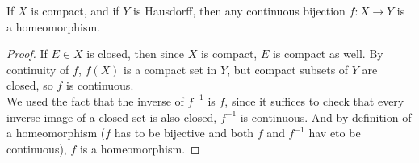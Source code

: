 \documentclass[../../main.tex]{subfiles}
\begin{document}
\begin{wts}
If $X$ is compact, and if $Y$ is Hausdorff, then any continuous bijection $f:X\to Y$ is a homeomorphism.
\end{wts}
\begin{proof}
If $E\in X$ is closed, then since $X$ is compact, $E$ is compact as well. By continuity of $f$, $f(X)$ is a compact set in $Y$, but compact subsets of $Y$ are closed, so $f$ is continuous.\\

We used the fact that the inverse of $f^{-1}$ is $f$, since it suffices to check that every inverse image of a closed set is also closed, $f^{-1}$ is continuous. And by definition of a homeomorphism ($f$ has to be bijective and both $f$ and $f^{-1}$ hav eto be continuous), $f$ is a homeomorphism.
\end{proof}
\end{document}
